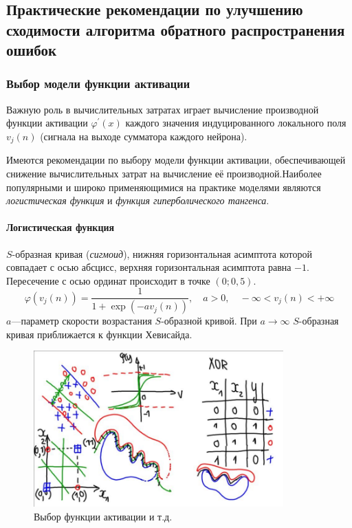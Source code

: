 \documentclass[a4paper]{article}
\numberwithin{equation}{subsection}
\begin{document}
\subsection{Практические рекомендации по улучшению сходимости алгоритма обратного распространения ошибок}




\subsubsection{Выбор модели функции активации}

Важную роль в вычислительных затратах играет вычисление производной функции активации
$\varphi^\prime (x)$ каждого значения индуцированного локального поля $v_j(n)$
(сигнала на выходе сумматора каждого нейрона).

Имеются рекомендации по выбору модели функции активации, обеспечивающей снижение
вычислительных затрат на вычисление её производной.Наиболее популярными и широко
применяющимися на практике моделями являются \textit{логистическая функция}
и \textit{функция гиперболического тангенса}.




\paragraph{Логистическая функция}

$S$-образная кривая (\textit{сигмоид}), нижняя горизонтальная асимптота которой 
совпадает с осью абсцисс, верхняя горизонтальная асимптота равна $-1$. 
Пересечение с осью ординат происходит в точке $(0; 0,5)$.
\begin{equation}
    \varphi (v_j(n)) = \dfrac{1}{1+\exp(-a v_j(n))},
    \quad a>0, \quad -\infty<v_j(n)<+\infty
\end{equation}
$a$---параметр скорости возрастания $S$-образной кривой. При $a\to\infty$ 
$S$-образная кривая приближается к функции Хевисайда.

\begin{figure}[htbp]
    \centering
    \includegraphics[height=6cm]{hyperflat_2_1.jpeg}
    \caption{Выбор функции активации и т.д.}
    \label{hyperflat_2_1}
\end{figure}
\end{document}
